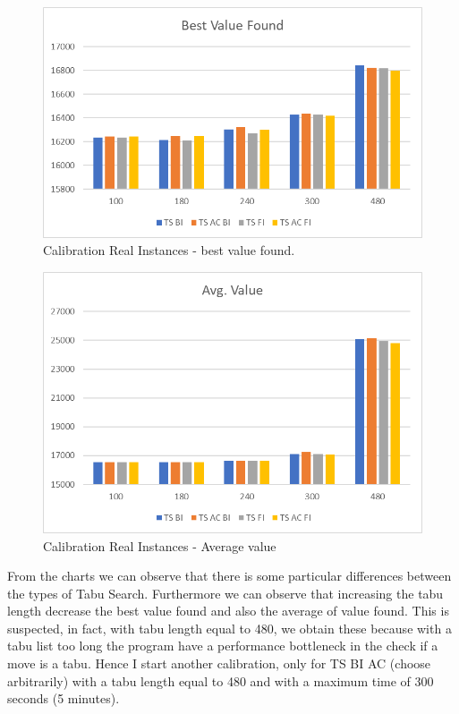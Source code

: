 			\begin{figure} [hb]
				\centering
				\includegraphics[width=\linewidth]{img/RI-calibration-SC}
				\caption{Calibration Real Instances - best value found.}
				\label{fig:ri-calibration-sc}
			\end{figure}

\newpage	
	
		\begin{figure}[ht]
			\centering
			\includegraphics[width=\linewidth]{img/RI-calibration-SC-avg}
			\caption{Calibration Real Instances - Average value}
			\label{fig:ri-calibration-sc-avg}
		\end{figure}
		
			From the charts we can observe that there is some particular differences between the types of Tabu Search. 
			Furthermore we can observe that increasing the tabu length decrease the best value found and also the average of value found. This is suspected, in fact, with tabu length equal to 480, we obtain these because with a tabu list too long the program have a performance bottleneck in the check if a move is a tabu. Hence I start another calibration, only for TS BI AC (choose arbitrarily) with a tabu length equal to 480 and with a maximum time of 300 seconds (5 minutes).
			
